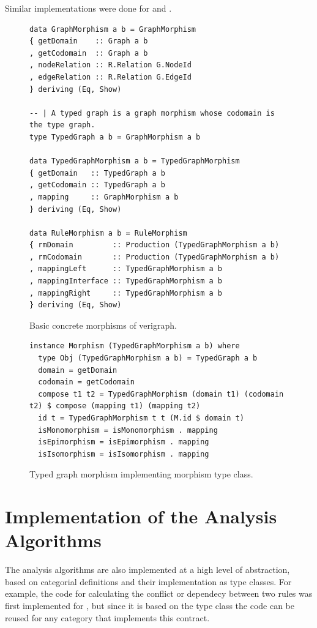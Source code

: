 Similar implementations were done for  and .

\begin{figure}[!ht]
\caption{Basic concrete morphisms of verigraph.}
\begin{verbatim}
data GraphMorphism a b = GraphMorphism 
{ getDomain    :: Graph a b
, getCodomain  :: Graph a b
, nodeRelation :: R.Relation G.NodeId
, edgeRelation :: R.Relation G.EdgeId
} deriving (Eq, Show)

-- | A typed graph is a graph morphism whose codomain is the type graph.
type TypedGraph a b = GraphMorphism a b

data TypedGraphMorphism a b = TypedGraphMorphism 
{ getDomain   :: TypedGraph a b
, getCodomain :: TypedGraph a b
, mapping     :: GraphMorphism a b
} deriving (Eq, Show)

data RuleMorphism a b = RuleMorphism 
{ rmDomain         :: Production (TypedGraphMorphism a b)
, rmCodomain       :: Production (TypedGraphMorphism a b)
, mappingLeft      :: TypedGraphMorphism a b
, mappingInterface :: TypedGraphMorphism a b
, mappingRight     :: TypedGraphMorphism a b
} deriving (Eq, Show)
\end{verbatim}
\label{fig:verigraph:concrete-morphisms}
\end{figure}

\begin{figure}[!ht]
\caption{Typed graph morphism implementing morphism type class.}
\begin{verbatim}
instance Morphism (TypedGraphMorphism a b) where
  type Obj (TypedGraphMorphism a b) = TypedGraph a b
  domain = getDomain
  codomain = getCodomain
  compose t1 t2 = TypedGraphMorphism (domain t1) (codomain t2) $ compose (mapping t1) (mapping t2)
  id t = TypedGraphMorphism t t (M.id $ domain t)
  isMonomorphism = isMonomorphism . mapping
  isEpimorphism = isEpimorphism . mapping
  isIsomorphism = isIsomorphism . mapping

\end{verbatim}
\label{fig:verigraph:morphism-implementation}
\end{figure}

\section{Implementation of the Analysis Algorithms}

The analysis algorithms are also implemented at a high level of abstraction, based on categorial definitions and their implementation as type classes. For example, the code for calculating the conflict or dependecy between two rules was first implemented for , but since it is based on the  type class the code can be reused for any category that implements this contract.

